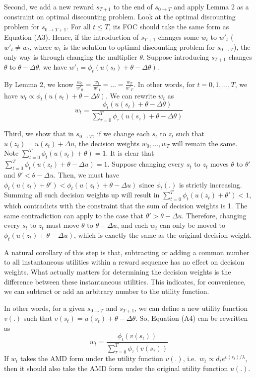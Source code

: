 Second, we add a new reward \(s_{T+1}\) to the end of
\(s_{0\rightarrow T}\) and apply Lemma 2 as a constraint on optimal
discounting problem. Look at the optimal discounting problem for
\(s_{0\rightarrow T+1}\). For all \(t\leq T\), its FOC should take the
same form as Equation (A3). Hence, if the introduction of \(s_{T+1}\)
changes some \(w_t\) to \(w'_t\) (\(w'_t \neq w_t\), where \(w_t\) is
the solution to optimal discounting problem for \(s_{0\rightarrow T}\)),
the only way is through changing the multiplier \(\theta\). Suppose
introducing \(s_{T+1}\) changes \(\theta\) to \(\theta-\Delta \theta\),
we have \(w'_t = \phi_t(u(s_t)+\theta-\Delta \theta)\).

By Lemma 2, we know
\(\frac{w_0}{w'_0}=\frac{w_1}{w'_1}=…=\frac{w_T}{w'_T}\). In other
words, for \(t=0,1,…,T\), we have
\(w_t \propto \phi_t(u(s_t)+\theta-\Delta \theta)\). We can rewrite
\(w_t\) as \[\tag{A4}
w_t = \frac{\phi_t(u(s_t)+\theta-\Delta \theta)}{\sum_{\tau=0}^{T}\phi_\tau(u(s_\tau)+\theta-\Delta \theta)}
\]

Third, we show that in \(s_{0\rightarrow T}\), if we change each \(s_t\)
to \(z_t\) such that \(u(z_t)=u(s_t)+\Delta u\), the decision weights
\(w_0,…,w_T\) will remain the same. Note
\(\sum_{t=0}^T \phi_t(u(s_t)+\theta)=1\). It is clear that
\(\sum_{t=0}^T \phi_t(u(z_t)+\theta-\Delta u)=1\). Suppose changing
every \(s_t\) to \(z_t\) moves \(\theta\) to \(\theta'\) and
\(\theta'<\theta-\Delta u\). Then, we must have
\(\phi_t(u(z_t)+\theta')<\phi_t(u(z_t)+\theta-\Delta u)\) since
\(\phi_t(.)\) is strictly increasing. Summing all such decision weights
up will result in \(\sum_{t=0}^T \phi_t(u(z_t)+\theta')<1\), which
contradicts with the constraint that the sum of decision weights is 1.
The same contradiction can apply to the case that
\(\theta'>\theta-\Delta u\). Therefore, changing every \(s_t\) to
\(z_t\) must move \(\theta\) to \(\theta - \Delta u\), and each \(w_t\)
can only be moved to \(\phi_t(u(z_t)+\theta -\Delta u)\), which is
exactly the same as the original decision weight.

A natural corollary of this step is that, subtracting or adding a common
number to all instantaneous utilities within a reward sequence has no
effect on decision weights. What actually matters for determining the
decision weights is the difference between these instantaneous
utilities. This indicates, for convenience, we can subtract or add an
arbitrary number to the utility function.

In other words, for a given \(s_{0\rightarrow T}\) and \(s_{T+1}\), we
can define a new utility function \(v(.)\) such that
\(v(s_t) = u(s_t) +\theta-\Delta \theta\). So, Equation (A4) can be
rewritten as\[\tag{A5}
w_t = \frac{\phi_t(v(s_t))}{\sum_{\tau=0}^{T}\phi_\tau(v(s_\tau))}
\]If \(w_t\) takes the AMD form under the utility function \(v(.)\),
i.e.~\(w_t \propto d_t e^{v(s_t)/\lambda}\), then it should also take
the AMD form under the original utility function \(u(.)\).

